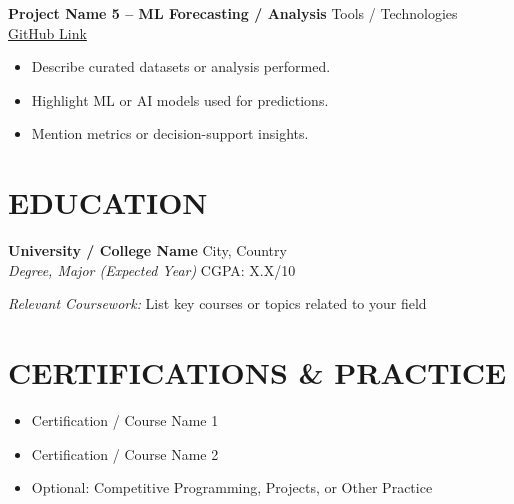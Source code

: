 \documentclass[a4paper,10pt]{article}
\begin{document}
\textbf{Project Name 5 – ML Forecasting / Analysis} \hfill Tools / Technologies\\
\href{https://github.com/placeholder}{GitHub Link}
\begin{itemize}[nosep]
    \item Describe curated datasets or analysis performed.
    \item Highlight ML or AI models used for predictions.
    \item Mention metrics or decision-support insights.
\end{itemize}

\section*{EDUCATION}

\textbf{University / College Name} \hfill City, Country\\
\textit{Degree, Major (Expected Year)} \hfill CGPA: X.X/10

\textit{Relevant Coursework:} List key courses or topics related to your field

\section*{CERTIFICATIONS \& PRACTICE}
\begin{itemize}[nosep]
    \item Certification / Course Name 1
    \item Certification / Course Name 2
    \item Optional: Competitive Programming, Projects, or Other Practice
\end{itemize}
\end{document}
